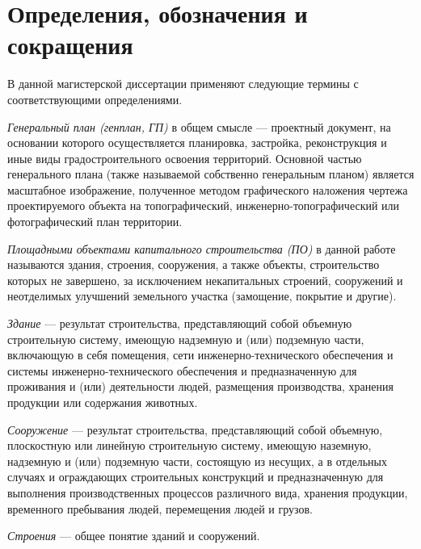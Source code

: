 \section*{\Large{Определения, обозначения и сокращения}}

В данной магистерской диссертации применяют следующие термины с соответствующими определениями.

\textit{Генеральный план (генплан, ГП)} в общем смысле —
проектный документ, на основании которого осуществляется планировка,
застройка, реконструкция и иные виды градостроительного освоения территорий.
Основной частью генерального плана (также называемой собственно генеральным планом)
является масштабное изображение, полученное методом графического наложения чертежа
проектируемого объекта на топографический,
инженерно-топографический или фотографический план территории.


\textit{Площадными объектами капитального строительства (ПО)} в данной работе называются
здания, строения, сооружения, а также объекты, строительство которых не завершено, за исключением некапитальных строений,
сооружений и неотделимых улучшений земельного участка (замощение, покрытие и другие)\cite{CapitalBuilding}.


\textit{Здание} — результат строительства, представляющий собой объемную строительную систему,
имеющую надземную и (или) подземную части, включающую в себя помещения,
сети инженерно-технического обеспечения и системы инженерно-технического обеспечения и предназначенную для проживания и
(или) деятельности людей, размещения производства, хранения продукции или содержания животных\cite{SafetyBuildings}.


\textit{Сооружение} — результат строительства,
представляющий собой объемную, плоскостную или линейную строительную систему,
имеющую наземную, надземную и (или) подземную части, состоящую из несущих,
а в отдельных случаях и ограждающих строительных конструкций и предназначенную для выполнения
производственных процессов различного вида, хранения продукции, временного пребывания людей,
перемещения людей и грузов\cite{SafetyBuildings}.


\textit{Строения} — общее понятие зданий и сооружений\cite{CivilCode}.


